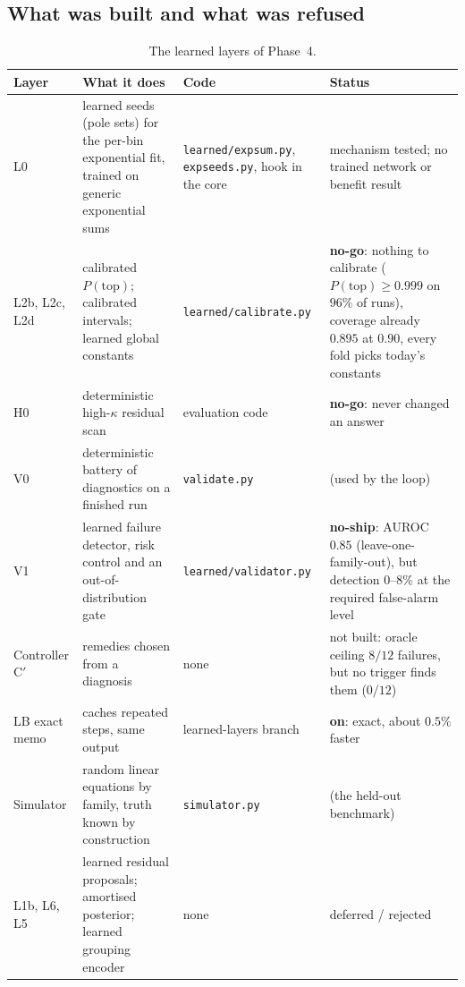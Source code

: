 \subsection{What was built and what was refused}
\begin{table}[!htb]
\centering\small
\begin{tabular}{@{}L{2.0cm}L{5.2cm}L{3.2cm}L{2.4cm}@{}}
\toprule
Layer & What it does & Code & Status\\\midrule
L0 & learned seeds (pole sets) for the per-bin exponential fit, trained on generic exponential sums & \texttt{learned/expsum.py}, \texttt{expseeds.py}, hook in the core & mechanism tested; no trained network or benefit result\\
L2b, L2c, L2d & calibrated $P(\text{top})$; calibrated intervals; learned global constants & \texttt{learned/}\allowbreak\texttt{calibrate.py} & \textbf{no-go}: nothing to calibrate ($P(\text{top})\ge0.999$ on $96\%$ of runs), coverage already $0.895$ at $0.90$, every fold picks today's constants\\
H0 & deterministic high-$\kappa$ residual scan & evaluation code & \textbf{no-go}: never changed an answer\\
V0 & deterministic battery of diagnostics on a finished run & \texttt{validate.py} & \impl{} (used by the loop)\\
V1 & learned failure detector, risk control and an out-of-distribution gate & \texttt{learned/}\allowbreak\texttt{validator.py} & \textbf{no-ship}: AUROC $0.85$ (leave-one-family-out), but detection $0$--$8\%$ at the required false-alarm level\\
Controller C$'$ & remedies chosen from a diagnosis & none & not built: oracle ceiling $8/12$ failures, but no trigger finds them ($0/12$)\\
LB exact memo & caches repeated steps, same output & learned-layers branch & \textbf{on}: exact, about $0.5\%$ faster\\
Simulator & random linear equations by family, truth known by construction & \texttt{simulator.py} & \impl{} (the held-out benchmark)\\
L1b, L6, L5 & learned residual proposals; amortised posterior; learned grouping encoder & none & deferred / rejected\\
\bottomrule
\end{tabular}
\caption{The learned layers of Phase~4.}
\end{table}

